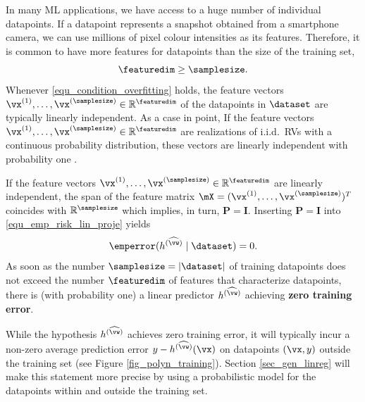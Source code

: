 \documentclass[12pt]{report}
\begin{document}
In many ML applications, we have access to a huge number of individual datapoints. If a datapoint represents 
a snapshot obtained from a smartphone camera, we can use millions of pixel colour intensities as its features. 
Therefore, it is common to have more features for datapoints than the size of the training set, 
\begin{equation} 
\label{equ_condition_overfitting}
\featuredim  \geq \samplesize. 
\end{equation} 
Whenever \eqref{equ_condition_overfitting} holds, the feature vectors $\vx^{(1)},\ldots,\vx^{(\samplesize)} \in \mathbb{R}^{\featuredim}$ 
of the datapoints in $\dataset$ are typically linearly independent. As a case in point, If the feature vectors 
$\vx^{(1)},\ldots,\vx^{(\samplesize)} \in \mathbb{R}^{\featuredim}$ are realizations of i.i.d.\ RVs with a 
continuous probability distribution, these vectors are linearly independent with probability one \cite{Muirhead1982}. 

If the feature vectors $\vx^{(1)},\ldots,\vx^{(\samplesize)} \in \mathbb{R}^{\featuredim}$ 
are linearly independent, the span of the feature matrix $\mX =  (\vx^{(1)},\ldots,\vx^{(\samplesize)})^{T}$ 
coincides with $\mathbb{R}^{\samplesize}$ which implies, in turn, $\mathbf{P} = \mathbf{I}$. 
Inserting $\mathbf{P} = \mathbf{I}$ into \eqref{equ_emp_risk_lin_proje} yields 
\begin{equation}
\label{eq_zero_trianing_error}
\emperror(h^{(\widehat{\vw})} \mid \dataset) = 0.
\end{equation} 
As soon as the number $\samplesize= | \dataset|$ of training datapoints does 
not exceed the number $\featuredim$ of features that characterize datapoints, there 
is (with probability one) a linear predictor $h^{(\widehat{\vw})}$ achieving {\bf zero training error}.  

While the hypothesis $h^{(\widehat{\vw})}$ achieves zero training error, it will typically incur a 
non-zero average prediction error $y - h^{(\widehat{\vw})}(\vx)$ on datapoints $(\vx,y)$ 
outside the training set (see Figure \ref{fig_polyn_training}). Section \ref{sec_gen_linreg} 
will make this statement more precise by using a probabilistic model for the datapoints 
within and outside the training set. 
\end{document}
